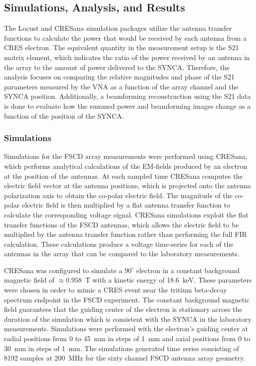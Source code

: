 \subsection{Simulations, Analysis, and Results}

The Locust and CRESana simulation packages utilize the antenna transfer functions to calculate the power that would be received by each antenna from a CRES electron. The equivalent quantity in the measurement setup is the S21 matrix element, which indicates the ratio of the power received by an antenna in the array to the amount of power delivered to the SYNCA. Therefore, the analysis focuses on comparing the relative magnitudes and phase of the S21 parameters measured by the VNA as a function of the array channel and the SYNCA position. Additionally, a beamforming reconstruction using the S21 data is done to evaluate how the summed power and beamforming images change as a function of the position of the SYNCA.

\subsubsection{Simulations}

Simulations for the FSCD array measurements were performed using CRESana, which performs analytical calculations of the EM-fields produced by an electron at the position of the antennas. At each sampled time CRESana computes the electric field vector at the antenna positions, which is projected onto the antenna polarization axis to obtain the co-polar electric field. The magnitude of the co-polar electric field is then multiplied by a flat antenna transfer function to calculate the corresponding voltage signal. CRESana simulations exploit the flat transfer functions of the FSCD antennas, which allows the electric field to be multiplied by the antenna transfer function rather than performing the full FIR calculation. These calculations produce a voltage time-series for each of the antennas in the array that can be compared to the laboratory measurements.

CRESana was configured to simulate a $90^\circ$ electron in a constant background magnetic field of $\approx0.958$~T with a kinetic energy of 18.6~keV. These parameters were chosen in order to mimic a CRES event near the tritium beta-decay spectrum endpoint in the FSCD experiment. The constant background magnetic field guarantees that the guiding center of the electron is stationary across the duration of the simulation which is consistent with the SYNCA in the laboratory measurements. Simulations were performed with the electron's guiding center at radial positions from 0 to 45~mm in steps of 1~mm and axial positions from 0 to 30~mm in steps of 1~mm. The simulations generated time series consisting of 
8192 samples at 200~MHz for the sixty channel FSCD antenna array geometry.

